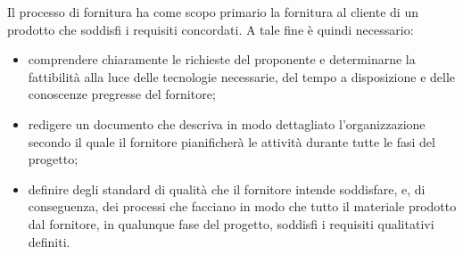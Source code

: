 Il processo di fornitura ha come scopo primario la fornitura al cliente di un prodotto che soddisfi i 
requisiti concordati. A tale fine \`{e} quindi necessario:

\begin{itemize}
    \item comprendere chiaramente le richieste del proponente e determinarne la fattibilit\`{a} alla luce delle tecnologie necessarie, del tempo a disposizione e delle conoscenze pregresse del fornitore;
    \item redigere un documento che descriva in modo dettagliato l'organizzazione secondo il quale il fornitore pianificher\`{a} le attivit\`{a} durante tutte le fasi del progetto; %
    \item definire degli standard di qualit\`{a} che il fornitore intende soddisfare, e, di conseguenza, dei processi che facciano in modo che tutto il materiale prodotto dal fornitore, in qualunque fase del progetto, soddisfi i requisiti qualitativi definiti.
\end{itemize}